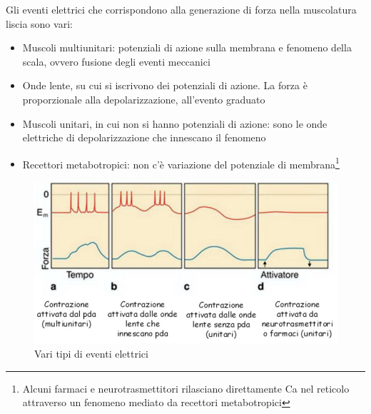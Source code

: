 \documentclass[a4paper,12pt]{article}
\begin{document}
Gli eventi elettrici che corrispondono alla generazione di forza nella muscolatura liscia sono vari: 
\begin{itemize}
\item{Muscoli multiunitari: potenziali di azione sulla membrana e fenomeno della scala, ovvero fusione degli eventi meccanici}
\item{Onde lente, su cui si iscrivono dei potenziali di azione. La forza è proporzionale alla depolarizzazione, all'evento graduato}
\item{Muscoli unitari, in cui non si hanno potenziali di azione: sono le onde elettriche di depolarizzazione che innescano il fenomeno}
\item{Recettori metabotropici: non c'è variazione del potenziale di membrana\footnote{Alcuni farmaci e neurotrasmettitori rilasciano direttamente Ca nel reticolo attraverso un fenomeno mediato da recettori metabotropici}}
\end{itemize}
\begin{figure}[H]
\centering
\includegraphics[scale=0.4]{immagine/contrazioneliscio.jpg}
\caption{Vari tipi di eventi elettrici}
\end{figure}
\end{document}
